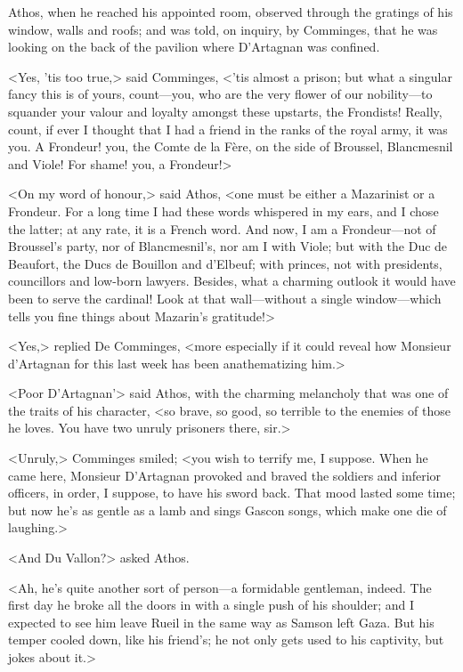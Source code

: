 Athos, when he reached his appointed room, observed through the gratings of his window, walls and roofs; and was told, on inquiry, by Comminges, that he was looking on the back of the pavilion where D'Artagnan was confined.

<Yes, 'tis too true,> said Comminges, <'tis almost a prison; but what a singular fancy this is of yours, count—you, who are the very flower of our nobility—to squander your valour and loyalty amongst these upstarts, the Frondists! Really, count, if ever I thought that I had a friend in the ranks of the royal army, it was you. A Frondeur! you, the Comte de la Fère, on the side of Broussel, Blancmesnil and Viole! For shame! you, a Frondeur!>

<On my word of honour,> said Athos, <one must be either a Mazarinist or a Frondeur. For a long time I had these words whispered in my ears, and I chose the latter; at any rate, it is a French word. And now, I am a Frondeur—not of Broussel's party, nor of Blancmesnil's, nor am I with Viole; but with the Duc de Beaufort, the Ducs de Bouillon and d'Elbeuf; with princes, not with presidents, councillors and low-born lawyers. Besides, what a charming outlook it would have been to serve the cardinal! Look at that wall—without a single window—which tells you fine things about Mazarin's gratitude!>

<Yes,> replied De Comminges, <more especially if it could reveal how Monsieur d'Artagnan for this last week has been anathematizing him.>

<Poor D'Artagnan'> said Athos, with the charming melancholy that was one of the traits of his character, <so brave, so good, so terrible to the enemies of those he loves. You have two unruly prisoners there, sir.>

<Unruly,> Comminges smiled; <you wish to terrify me, I suppose. When he came here, Monsieur D'Artagnan provoked and braved the soldiers and inferior officers, in order, I suppose, to have his sword back. That mood lasted some time; but now he's as gentle as a lamb and sings Gascon songs, which make one die of laughing.>

<And Du Vallon?> asked Athos.

<Ah, he's quite another sort of person—a formidable gentleman, indeed. The first day he broke all the doors in with a single push of his shoulder; and I expected to see him leave Rueil in the same way as Samson left Gaza. But his temper cooled down, like his friend's; he not only gets used to his captivity, but jokes about it.>

